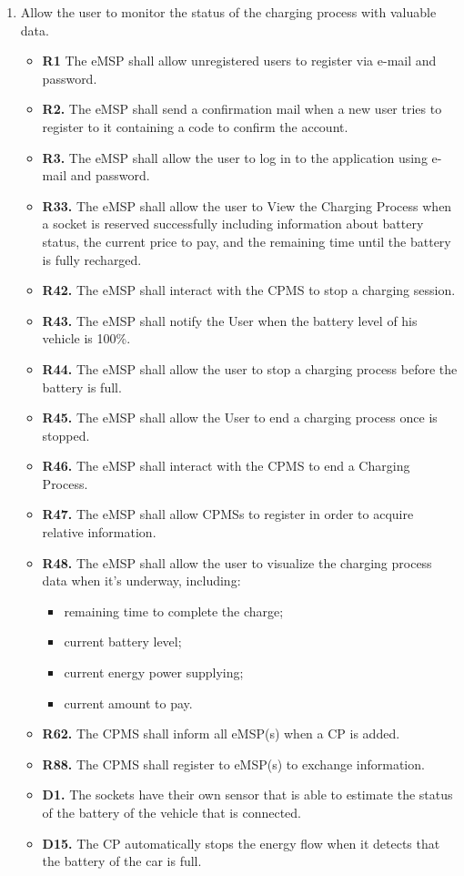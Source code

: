 \documentclass{Configuration_Files/PoliMi3i_thesis}
\begin{document}
\begin{enumerate}[label=\textbf{G\arabic*}]
    \item Allow the user to monitor the status of the charging process with valuable data.
        \begin{itemize}
            \item \textbf{R1} The eMSP shall allow unregistered users to register via e-mail and password.
            \item \textbf{R2.} The eMSP shall send a confirmation mail when a new user tries to register to it containing a code to confirm the account.
            \item \textbf{R3.} The eMSP shall allow the user to log in to the application using e-mail and password.
            \item \textbf{R33.} The eMSP shall allow the user to View  the Charging Process when a socket is reserved successfully including information about battery status, the current price to pay, and the remaining time until the battery is fully recharged.
            \item \textbf{R42.} The eMSP shall interact with the CPMS to stop a charging session.
            \item \textbf{R43.} The eMSP shall notify the User when the battery level of his vehicle is 100\%.
            \item \textbf{R44.} The eMSP shall allow the user to stop a charging process before the battery is full.
            \item \textbf{R45.} The eMSP shall allow the User to end a charging process once is stopped.
            \item \textbf{R46.} The eMSP shall interact with the CPMS to end a Charging Process.
            \item \textbf{R47.} The eMSP shall allow CPMSs to register in order to acquire relative information.
            \item \textbf{R48.} The eMSP shall allow the user to visualize the charging process data when it’s underway, including:
                \begin{itemize}
                    \item remaining time to complete the charge;
                    \item current battery level;
                    \item current energy power supplying;
                    \item current amount to pay.
                \end{itemize}
            \item \textbf{R62.} The CPMS shall inform all eMSP(s) when a CP is added.
            \item \textbf{R88.} The CPMS shall register to eMSP(s) to exchange information.
            \item \textbf{D1.} The sockets have their own sensor that is able to estimate the status of the battery of the vehicle that is connected.
            \item \textbf{D15.} The CP automatically stops the energy flow when it detects that the battery of the car is full.
        \end{itemize}


\end{enumerate}
\end{document}
